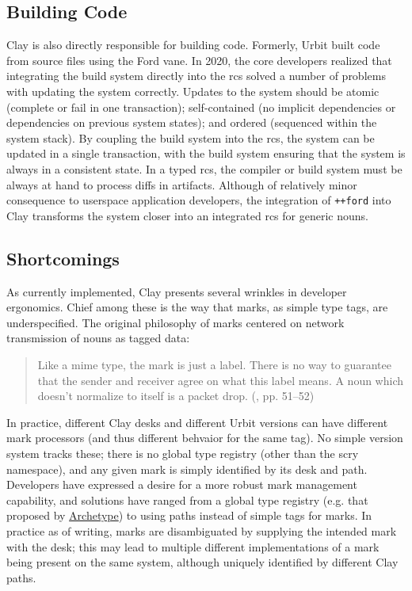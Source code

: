 \documentclass[twoside]{article}
\begin{document}
\subsection{Building Code}

Clay is also directly responsible for building code.  Formerly, Urbit built code from source files using the Ford vane.  In 2020, the core developers realized that integrating the build system directly into the {\sc rcs} solved a number of problems with updating the system correctly.  Updates to the system should be atomic (complete or fail in one transaction); self-contained (no implicit dependencies or dependencies on previous system states); and ordered (sequenced within the system stack).  By coupling the build system into the {\sc rcs}, the system can be updated in a single transaction, with the build system ensuring that the system is always in a consistent state.  In a typed {\sc rcs}, the compiler or build system must be always at hand to process diffs in artifacts.  Although of relatively minor consequence to userspace application developers, the integration of \lstinline[style=inlinecode]{++ford} into Clay transforms the system closer into an integrated {\sc rcs} for generic nouns.

\subsection{Shortcomings}

As currently implemented, Clay presents several wrinkles in developer ergonomics.  Chief among these is the way that marks, as simple type tags, are underspecified.  The original philosophy of marks centered on network transmission of nouns as tagged data:

\begin{quote}
  Like a {\sc mime} type, the mark is just a label. There is no way to guarantee that the sender and receiver agree on what this label means.  A noun which doesn't normalize to itself is a packet drop.  (\citet{Whitepaper}, pp. 51–52)
\end{quote}

\noindent
In practice, different Clay desks and different Urbit versions can have different mark processors (and thus different behvaior for the same tag).  No simple version system tracks these; there is no global type registry (other than the scry namespace), and any given mark is simply identified by its desk and path.  Developers have expressed a desire for a more robust mark management capability, and solutions have ranged from a global type registry (e.g. that proposed by \href{https://www.archetype.computer/}{Archetype}) to using paths instead of simple tags for marks.  In practice as of writing, marks are disambiguated by supplying the intended mark with the desk; this may lead to multiple different implementations of a mark being present on the same system, although uniquely identified by different Clay paths.
\end{document}
